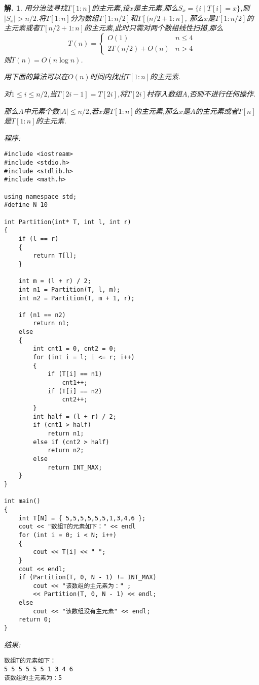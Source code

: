 \documentclass[a4paper,oneside,12pt]{ctexart}
\theoremstyle{plain}
\theoremstyle{nonumberplain}
\newtheorem{solution}{解.}
\theoremstyle{nonumberplain}
\newcommand{\abs}[1]{\left\vert#1\right\vert}
\begin{document}
    \begin{solution}
        用分治法寻找$T[1:n]$的主元素,设$x$是主元素,那么$S_x=\{i\mid T[i]=x\}$,则$\abs{S_x}>n/2$.将$T[1:n]$分为数组$T[1:n/2]$和$T[(n/2+1:n]$,
        那么$x$是$T[1:n/2]$的主元素或者$T[n/2+1:n]$的主元素,此时只需对两个数组线性扫描,那么 
        \begin{equation*}
            T(n)=\begin{cases}
                O(1)&n\leqslant 4\\
                2T(n/2)+O(n)&n>4
            \end{cases}
        \end{equation*}
        则$T(n)=O(n\log n)$.

        用下面的算法可以在$O(n)$时间内找出$T[1:n]$的主元素.

        对$1\leqslant i\leqslant n/2$,当$T[2i-1]=T[2i]$,将$T[2i]$村存入数组$A$,否则不进行任何操作.

        那么$A$中元素个数$\abs{A}\leqslant n/2$,若$x$是$T[1:n]$的主元素,那么$x$是$A$的主元素或者$T[n]$是$T[1:n]$的主元素.

        程序:
\begin{lstlisting}
#include <iostream>
#include <stdio.h>
#include <stdlib.h>
#include <math.h>

using namespace std;
#define N 10

int Partition(int* T, int l, int r)
{
	if (l == r)
	{
		return T[l];
	}

	int m = (l + r) / 2;
	int n1 = Partition(T, l, m);
	int n2 = Partition(T, m + 1, r);

	if (n1 == n2)
		return n1;
	else
	{
		int cnt1 = 0, cnt2 = 0;
		for (int i = l; i <= r; i++)
		{
			if (T[i] == n1)
				cnt1++;
			if (T[i] == n2)
				cnt2++;
		}
		int half = (l + r) / 2;
		if (cnt1 > half)
			return n1;
		else if (cnt2 > half)
			return n2;
		else
			return INT_MAX;
	}
}

int main()
{
	int T[N] = { 5,5,5,5,5,5,1,3,4,6 };
	cout << "数组T的元素如下：" << endl
	for (int i = 0; i < N; i++)
	{
		cout << T[i] << " ";
	}
	cout << endl;
	if (Partition(T, 0, N - 1) != INT_MAX)
		cout << "该数组的主元素为：" ;
        << Partition(T, 0, N - 1) << endl;
	else
		cout << "该数组没有主元素" << endl;
	return 0;
}
\end{lstlisting}
结果:
    \begin{lstlisting}
数组T的元素如下：
5 5 5 5 5 5 1 3 4 6
该数组的主元素为：5
    \end{lstlisting}
    \end{solution}
\end{document}
